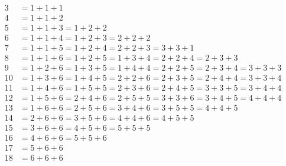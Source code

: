\documentclass[9pt,xcolor=dvipsnames,table]{beamer}
\begin{document}
\begin{frame}[fragile,t] %
 \begin{align*}
    3  & = 1 + 1 + 1                                                             \\
    4  & = 1 + 1 + 2                                                             \\
    5  & = 1 + 1 + 3 = 1 + 2 + 2                                                 \\
    6  & = 1 + 1 + 4 = 1 + 2 + 3 = 2 + 2 + 2                                     \\
    7  & = 1 + 1 + 5 = 1 + 2 + 4 = 2 + 2 + 3 = 3 + 3 + 1                         \\
    8  & = 1 + 1 + 6 = 1 + 2 + 5 = 1 + 3 + 4 = 2 + 2 + 4 = 2 + 3 + 3             \\
    9  & = 1 + 2 + 6 = 1 + 3 + 5 = 1 + 4 + 4 = 2 + 2 + 5 = 2 + 3 + 4 = 3 + 3 + 3 \\
    10 & = 1 + 3 + 6 = 1 + 4 + 5 = 2 + 2 + 6 = 2 + 3 + 5 = 2 + 4 + 4 = 3 + 3 + 4 \\
    11 & = 1 + 4 + 6 = 1 + 5 + 5 = 2 + 3 + 6 = 2 + 4 + 5 = 3 + 3 + 5 = 3 + 4 + 4 \\
    12 & = 1 + 5 + 6 = 2 + 4 + 6 = 2 + 5 + 5 = 3 + 3 + 6 = 3 + 4 + 5 = 4 + 4 + 4 \\
    13 & = 1 + 6 + 6 = 2 + 5 + 6 = 3 + 4 + 6 = 3 + 5 + 5 = 4 + 4 + 5             \\
    14 & = 2 + 6 + 6 = 3 + 5 + 6 = 4 + 4 + 6 = 4 + 5 + 5                         \\
    15 & = 3 + 6 + 6 = 4 + 5 + 6 = 5 + 5 + 5                                     \\
    16 & = 4 + 6 + 6 = 5 + 5 + 6                                                 \\
    17 & = 5 + 6 + 6                                                             \\
    18 & = 6 + 6 + 6
 \end{align*}
\end{frame}
\end{document}
